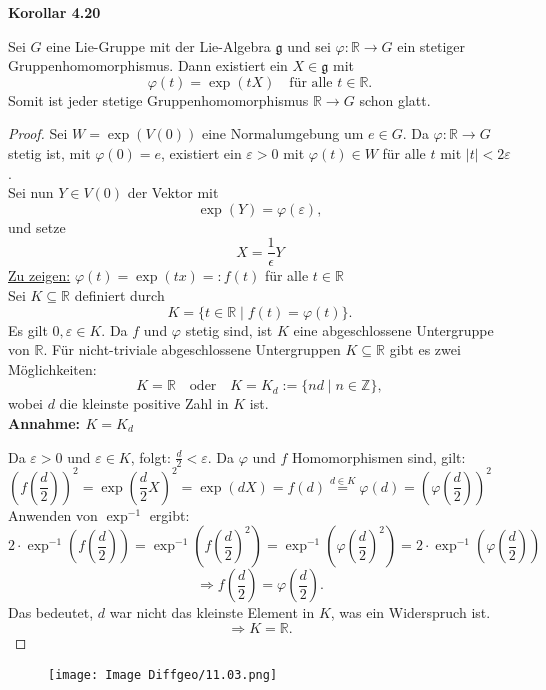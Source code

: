 \documentclass[fleqn, 12pt, letterpaper]{article}
\begin{document}
\textbf{Korollar 4.20}

Sei $G$ eine Lie-Gruppe mit der Lie-Algebra $\mathfrak{g}$ und sei $\varphi: \mathbb{R} \to G$ ein stetiger Gruppenhomomorphismus. Dann existiert ein $X \in \mathfrak{g}$ mit 
\[
\varphi(t) = \exp(tX) \quad \text{für alle } t \in \mathbb{R}.
\]
Somit ist jeder stetige Gruppenhomomorphismus $\mathbb{R} \to G$ schon glatt.

\begin{proof}
    Sei $W = \exp(V(0))$ eine Normalumgebung um $e \in G$. Da $\varphi: \mathbb{R} \to G$ stetig ist, mit $\varphi(0) = e$, existiert ein $\varepsilon > 0$ mit $\varphi(t) \in W$ für alle $t$ mit $|t| < 2\varepsilon$. \\

Sei nun $Y \in V(0)$ der Vektor mit 
\[
\exp(Y) = \varphi(\varepsilon),
\]
und setze
\[
X=\frac{1}{\epsilon}Y
\]
\underline{Zu zeigen:} $\varphi(t)=\exp(tx)=:f(t)$ für alle $t\in\mathbb{R}$
\\
Sei $K\subseteq \mathbb{R}$ definiert durch
\[
K = \{t \in \mathbb{R} \mid f(t) = \varphi(t)\}.
\]
Es gilt $0, \varepsilon \in K$. Da $f$ und $\varphi$ stetig sind, ist $K$ eine abgeschlossene Untergruppe von $\mathbb{R}$. Für nicht-triviale abgeschlossene Untergruppen $K \subseteq \mathbb{R}$ gibt es zwei Möglichkeiten: 
\[
K = \mathbb{R} \quad \text{oder} \quad K = K_d := \{nd\mid n\in\mathbb{Z}\}, 
\]
wobei $d$ die kleinste positive Zahl in $K$ ist.\\

\textbf{Annahme: $K = K_d$}

Da $\varepsilon > 0$ und $\varepsilon \in K$, folgt:
\(
\frac{d}{2} < \varepsilon.
\)
Da $\varphi$ und $f$ Homomorphismen sind, gilt:
\[
\left( f\left( \frac{d}{2} \right) \right)^2
= \exp\left( \frac{d}{2} X \right)^2
= \exp(dX)
= f(d)
\overset{d \in K}{=} \varphi(d)
= \left( \varphi\left( \frac{d}{2} \right) \right)^2
\qquad 
\]
Anwenden von $\exp^{-1}$ ergibt:
\[
2 \cdot \exp^{-1}\left( f\left( \frac{d}{2} \right) \right)
= \exp^{-1}\left( f\left( \frac{d}{2} \right)^2 \right)
= \exp^{-1}\left( \varphi\left( \frac{d}{2} \right)^2 \right)
= 2 \cdot \exp^{-1}\left( \varphi\left( \frac{d}{2} \right) \right)
\]
\[
\Rightarrow
f\left(\frac{d}{2}\right) = \varphi\left(\frac{d}{2}\right).
\]
Das bedeutet, $d$ war nicht das kleinste Element in $K$, was ein Widerspruch ist.
\[
\Rightarrow K = \mathbb{R}.
\]
\end{proof}
  \begin{figure}[H]
    \centering
    \texttt{[image: Image Diffgeo/11.03.png]}
 \end{figure}
\end{document}
